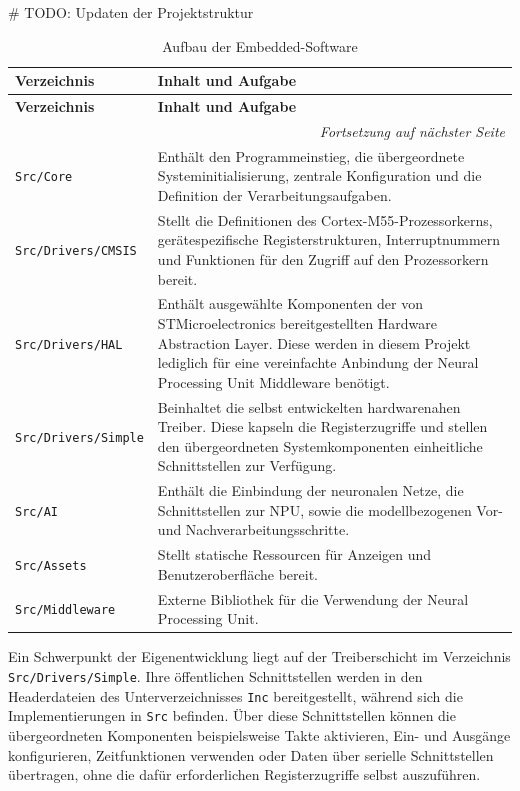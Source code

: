 \# TODO: Updaten der Projektstruktur

\begin{longtable}{|p{}|p{}|}
    \caption{Aufbau der Embedded-Software}
    \label{tab:sw-aufbau} \\
    \hline
    \textbf{Verzeichnis} & \textbf{Inhalt und Aufgabe} \\
    \hline
    \endfirsthead
    \hline
    \textbf{Verzeichnis} & \textbf{Inhalt und Aufgabe} \\
    \hline
    \endhead
    \hline
    \multicolumn{2}{r}{\textit{Fortsetzung auf nächster Seite}} \\
    \endfoot
    \hline
    \endlastfoot
    \texttt{Src/Core} & Enthält den Programmeinstieg, die übergeordnete Systeminitialisierung, zentrale Konfiguration und die Definition der Verarbeitungsaufgaben. \\
    \hline
    \texttt{Src/Drivers/CMSIS} & Stellt die Definitionen des Cortex-M55-Prozessorkerns, gerätespezifische Registerstrukturen, Interruptnummern und Funktionen für den Zugriff auf den Prozessorkern bereit. \\
    \hline
    \texttt{Src/Drivers/HAL} & Enthält ausgewählte Komponenten der von STMicroelectronics bereitgestellten Hardware Abstraction Layer. Diese werden in diesem Projekt lediglich für eine vereinfachte Anbindung der Neural Processing Unit Middleware benötigt. \\
    \hline
    \texttt{Src/Drivers/Simple} & Beinhaltet die selbst entwickelten hardwarenahen Treiber. Diese kapseln die Registerzugriffe und stellen den übergeordneten Systemkomponenten einheitliche Schnittstellen zur Verfügung. \\
    \hline
    \texttt{Src/AI} & Enthält die Einbindung der neuronalen Netze, die Schnittstellen zur NPU, sowie die modellbezogenen Vor- und Nachverarbeitungsschritte. \\
    \hline
    \texttt{Src/Assets} & Stellt statische Ressourcen für Anzeigen und Benutzeroberfläche bereit. \\
    \hline
    \texttt{Src/Middleware} & Externe Bibliothek für die Verwendung der Neural Processing Unit. \\
    \hline
\end{longtable}

Ein Schwerpunkt der Eigenentwicklung liegt auf der Treiberschicht im Verzeichnis \texttt{Src/Drivers/Simple}. Ihre öffentlichen Schnittstellen werden in den Headerdateien des Unterverzeichnisses \texttt{Inc} bereitgestellt, während sich die Implementierungen in \texttt{Src} befinden. Über diese Schnittstellen können die übergeordneten Komponenten beispielsweise Takte aktivieren, Ein- und Ausgänge konfigurieren, Zeitfunktionen verwenden oder Daten über serielle Schnittstellen übertragen, ohne die dafür erforderlichen Registerzugriffe selbst auszuführen.

